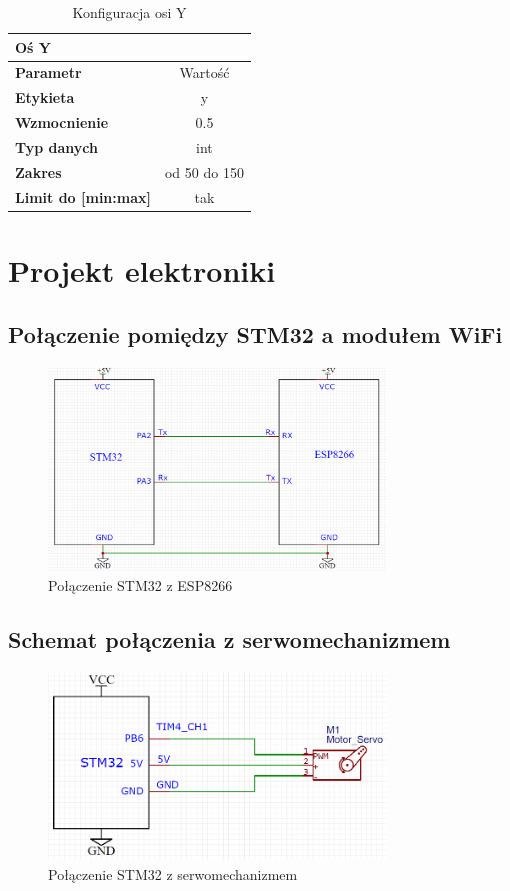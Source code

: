 \documentclass[10pt, a4paper]{article}
\begin{document}
	\begin{table}[H]
		\centering
		\begin{tabular}{|l|c|} 
			\hline
			\textbf{Oś Y} & \\
			\hline
			\textbf{Parametr} & Wartość \\
			\hline
			 \textbf{Etykieta}&y  \\\hline
			\hline  \textbf{Wzmocnienie}&0.5  \\\hline
			\textbf{Typ danych} & int\\\hline
			\textbf{Zakres} &  od 50 do 150\\
			\hline
			\textbf{Limit do [min:max]}& tak\\
			\hline
		\end{tabular}
		\caption{Konfiguracja osi Y}
		\label{tab:OsY}
	\end{table}

\section{Projekt elektroniki}
	\subsection{Połączenie pomiędzy STM32 a modułem WiFi}
		\begin{figure}[H]
			\centering
			\includegraphics[width=0.8\textwidth]{figures/uart.png}
			\caption{Połączenie STM32 z ESP8266}
			\label{fig:UART}
		\end{figure}
	
	\subsection{Schemat połączenia z serwomechanizmem}
	\begin{figure}[H]
		\centering
		\includegraphics[width=0.8\textwidth]{figures/servo.png}
		\caption{Połączenie STM32 z serwomechanizmem}
		\label{fig:Servo}
	\end{figure}
	
\end{document}
